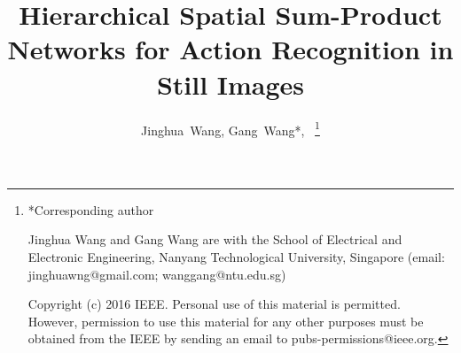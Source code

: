 \documentclass[journal]{IEEEtran}
\begin{document}
%
\title{Hierarchical Spatial Sum-Product Networks for Action Recognition in Still Images}
%
%
%

\author{Jinghua~Wang, Gang~Wang*,~
	\thanks{*Corresponding author


		Jinghua Wang and Gang Wang are with the School of Electrical and Electronic Engineering, Nanyang Technological University, Singapore (email: jinghuawng@gmail.com; wanggang@ntu.edu.sg)

		Copyright (c) 2016 IEEE. Personal use of this material is permitted.
		However, permission to use this material for any other purposes must be obtained from the IEEE by sending an email to pubs-permissions@ieee.org.
	}%
}

%
%
\end{document}
